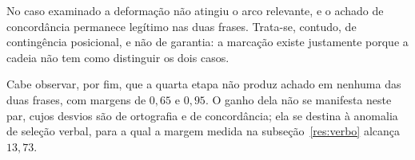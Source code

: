 No caso examinado a deformação não atingiu o arco relevante, e o achado de concordância
permanece legítimo nas duas frases. Trata-se, contudo, de contingência posicional, e não de
garantia: a marcação existe justamente porque a cadeia não tem como distinguir os dois casos.

Cabe observar, por fim, que a quarta etapa não produz achado em nenhuma das duas frases, com
margens de $0{,}65$ e $0{,}95$. O ganho dela não se manifesta neste par, cujos desvios são de
ortografia e de concordância; ela se destina à anomalia de seleção verbal, para a qual a margem
medida na subseção~\ref{res:verbo} alcança $13{,}73$.





%
%
%


